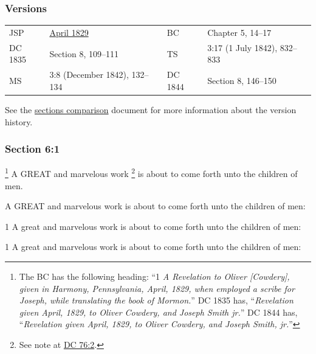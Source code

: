 	\subsubsection{Versions}
		\label{DC6-V}
	
		\begin{tabular}{p{1in}p{2in}p{1in}p{2in}}
			JSP		& \hyperref[EMS-1828-1829-JS-APR-1829-A]{April 1829}	& BC	& Chapter 5, 14--17 \\
			DC 1835 & Section 8, 109--111									& TS	& 3:17 (1 July 1842), 832--833 \\
			MS		& 3:8 (December 1842), 132--134							& DC 1844 & Section 8, 146--150 \\
		\end{tabular}
		
		\medskip
		
		See the \href{https://drive.google.com/file/d/1goAvNz8jS4R8slYfMG_db55Ty2z_vmgK/view?usp=sharing}{sections comparison} document for more information about the version history.

	\subsubsection{Section 6:1} %
		\label{DC6-1}

			\footnote{%
				The BC has the following heading: ``1 \textit{A Revelation to Oliver [Cowdery], given in Harmony, Pennsylvania, April, 1829, when employed a scribe for Joseph, while translating the book of Mormon.}'' DC 1835 has, ``\textit{Revelation given April, 1829, to Oliver Cowdery, and Joseph Smith jr.}'' DC 1844 has, ``\textit{Revelation given April, 1829, to Oliver Cowdery, and Joseph Smith, jr.}''
				}%
		A GREAT and marvelous work%
			\footnote{%
				See note at \hyperref[DC76-2]{DC 76:2}.
				}
		is about to come forth unto the children of men.

		\begin{framed}
		\scriptsize
			\begin{compactdesc}
				\item[JSP] A GREAT and marvelous work is about to come forth unto the children of men: 
				\item[DC 1835] 1 A great and marvelous work is about to come forth unto the children of men:
				\item[DC 1844] 1 A great and marvelous work is about to come forth unto the children of men: 
			\end{compactdesc}
		\end{framed}


